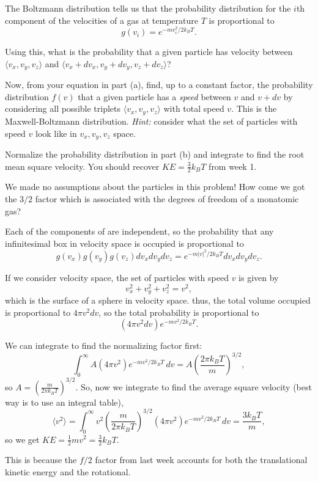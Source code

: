 \documentclass[11pt]{scrartcl}
\begin{document}
\begin{prob}
    The Boltzmann distribution tells us that the probability distribution for the $i$th component of the velocities of a gas at temperature $T$ is proportional to
    $$g(v_i) = e^{-mv_i^2/2k_BT}.$$
    \begin{anum}
        \item Using this, what is the probability that a given particle has velocity between $\langle v_x, v_y, v_z\rangle$ and $\langle v_x + dv_x, v_y + dv_y, v_z + dv_z\rangle$?
        \item Now, from your equation in part (a), find, up to a constant factor, the probability distribution $f(v)$ that a given particle has a \textit{speed} between $v$ and $v+dv$ by considering all possible triplets $\langle v_x,v_y,v_z\rangle$ with total speed $v$. This is the Maxwell-Boltzmann distribution. \textit{Hint:} consider what the set of particles with speed $v$ look like in $v_x,v_y,v_z$ space.
        \item Normalize the probability distribution in part (b) and integrate to find the root mean square velocity. You should recover $KE = \frac 32 k_BT$ from week 1.
        \item We made no assumptions about the particles in this problem! How come we got the $3/2$ factor which is associated with the degrees of freedom of a monatomic gas?
    \end{anum}  
\end{prob}
\begin{alphasol}
    \item Each of the components of are independent, so the probability that any infinitesimal box in velocity space is occupied is proportional to
    $$g(v_x)g(v_y)g(v_z) dv_xdv_ydv_z = e^{-m|v|^2/2k_BT} dv_xdv_ydv_z.$$
    \item If we consider velocity space, the set of particles with speed $v$ is given by
    $$v_x^2 + v_y^2 + v_z^2 = v^2,$$
    which is the surface of a sphere in velocity space. thus, the total volume occupied is proportional to $4\pi v^2 dv$, so the total probability is proportional to
    $$(4\pi v^2 dv)e^{-mv^2/2k_BT}.$$
    \item We can integrate to find the normalizing factor first:
    $$\int_0^\infty A (4\pi v^2)e^{-mv^2/2k_BT}\, dv = A\left(\frac{2\pi k_B T}{m}\right)^{3/2},$$
    so $A = \left(\frac{m}{2\pi k_BT}\right)^{3/2}.$ So, now we integrate to find the average square velocity (best way is to use an integral table),
    $$\langle v^2 \rangle = \int_0^\infty v^2 \left(\frac{m}{2\pi k_BT}\right)^{3/2} (4\pi v^2)e^{-mv^2/2k_BT}\, dv = \frac{3k_BT}{m},$$
    so we get $KE = \frac 12 mv^2 = \frac 32 k_B T.$
    \item This is because the $f/2$ factor from last week accounts for both the translational kinetic energy and the rotational.
\end{alphasol}
\end{document}
